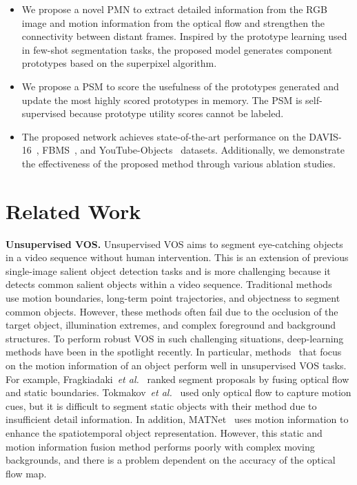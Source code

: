 \documentclass[10pt,twocolumn,letterpaper]{article}
\begin{document}
\begin{itemize}
	\item We propose a novel PMN to extract detailed information from the RGB image and motion information from the optical flow and strengthen the connectivity between distant frames. Inspired by the prototype learning used in few-shot segmentation tasks, the proposed model generates component prototypes based on the superpixel algorithm.
	
	\item We propose a PSM to score the usefulness of the prototypes generated and update the most highly scored prototypes in memory. The PSM is self-supervised because prototype utility scores cannot be labeled.
	
	\item The proposed network achieves state-of-the-art performance on the DAVIS-16~\cite{perazzi2016benchmark}, FBMS~\cite{ochs2013segmentation}, and YouTube-Objects~\cite{prest2012learning} datasets. Additionally, we demonstrate the effectiveness of the proposed method through various ablation studies.
\end{itemize}

\section{Related Work}

\noindent
\textbf{Unsupervised VOS.} Unsupervised VOS aims to segment eye-catching objects in a video sequence without human intervention. This is an extension of previous single-image salient object detection tasks and is more challenging because it detects common salient objects within a video sequence. Traditional methods~\cite{papazoglou2013fast, faktor2014video, zhou2016video, wang2015saliency, ochs2013segmentation} use motion boundaries, long-term point trajectories, and objectness to segment common objects. However, these methods often fail due to the occlusion of the target object, illumination extremes, and complex foreground and background structures. To perform robust VOS in such challenging situations, deep-learning methods have been in the spotlight recently. In particular, methods~\cite{fragkiadaki2015learning, tokmakov2017learning, zhou2020motion, ji2021full, kim2021aibm} that focus on the motion information of an object perform well in unsupervised VOS tasks. For example, Fragkiadaki~\textit{et al.}~\cite{fragkiadaki2015learning} ranked segment proposals by fusing optical flow and static boundaries. Tokmakov~\textit{et al.}~\cite{tokmakov2017learning} used only optical flow to capture motion cues, but it is difficult to segment static objects with their method due to insufficient detail information. In addition, MATNet~\cite{zhou2020motion} uses motion information to enhance the spatiotemporal object representation. However, this static and motion information fusion method performs poorly with complex moving backgrounds, and there is a problem dependent on the accuracy of the optical flow map.
\end{document}
